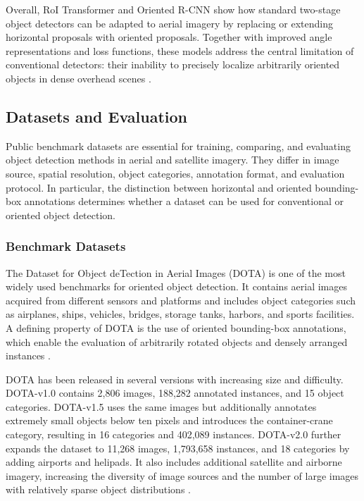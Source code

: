 Overall, RoI Transformer and Oriented R-CNN show how standard two-stage object detectors can be adapted to aerial imagery by replacing or extending horizontal proposals with oriented proposals. Together with improved angle representations and loss functions, these models address the central limitation of conventional detectors: their inability to precisely localize arbitrarily oriented objects in dense overhead scenes \cite{ding2018learning,xie2021oriented,yang2022arbitrary,yang2021learning}.


\subsection{Datasets and Evaluation}

Public benchmark datasets are essential for training, comparing, and evaluating object detection methods in aerial and satellite imagery. They differ in image source, spatial resolution, object categories, annotation format, and evaluation protocol. In particular, the distinction between horizontal and oriented bounding-box annotations determines whether a dataset can be used for conventional or oriented object detection.

\subsubsection{Benchmark Datasets}

The Dataset for Object deTection in Aerial Images (DOTA) is one of the most widely used benchmarks for oriented object detection. It contains aerial images acquired from different sensors and platforms and includes object categories such as airplanes, ships, vehicles, bridges, storage tanks, harbors, and sports facilities. A defining property of DOTA is the use of oriented bounding-box annotations, which enable the evaluation of arbitrarily rotated objects and densely arranged instances \cite{ding2021object}.

DOTA has been released in several versions with increasing size and difficulty. DOTA-v1.0 contains 2,806 images, 188,282 annotated instances, and 15 object categories. DOTA-v1.5 uses the same images but additionally annotates extremely small objects below ten pixels and introduces the container-crane category, resulting in 16 categories and 402,089 instances. DOTA-v2.0 further expands the dataset to 11,268 images, 1,793,658 instances, and 18 categories by adding airports and helipads. It also includes additional satellite and airborne imagery, increasing the diversity of image sources and the number of large images with relatively sparse object distributions \cite{ding2021object}.

